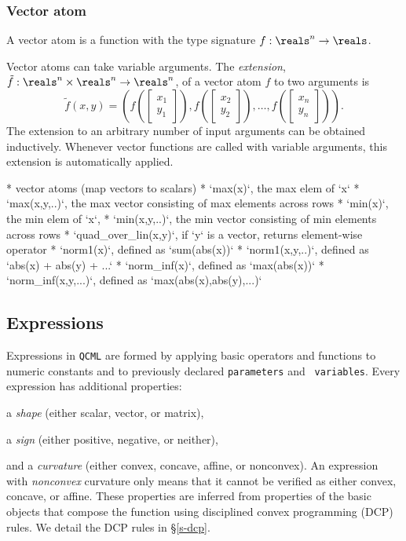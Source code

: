 \documentclass[11pt]{article}
\def\qcml{\texttt{QCML}\xspace}
\begin{document}
\subsubsection{Vector atom}
A vector atom is a function with the type signature $f : \reals^n \to \reals$.


Vector atoms can take variable arguments. 
The \emph{extension}, $\tilde f : \reals^n \times \reals^n \to \reals^n$, of 
a vector atom $f$ to two arguments is
\[
\tilde f(x, y) = \left( f\left(\begin{bmatrix} x_1 \\ y_1 \end{bmatrix}\right), 
  f\left(\begin{bmatrix}x_2 \\ y_2 \end{bmatrix}\right), \ldots, 
  f\left(\begin{bmatrix}x_n \\ y_n\end{bmatrix}\right) \right).
\]
The extension to an arbitrary number of input arguments can be obtained inductively.
Whenever vector functions are called with variable arguments, this extension
is automatically applied.

* vector atoms (map vectors to scalars)
  * `max(x)`, the max elem of `x`
  * `max(x,y,..)`, the max vector consisting of max elements across rows
  * `min(x)`, the min elem of `x`,
  * `min(x,y,..)`, the min vector consisting of min elements across rows
  * `quad\_over\_lin(x,y)`, if `y` is a vector, returns element-wise operator
  * `norm1(x)`, defined as `sum(abs(x))`
  * `norm1(x,y,..)`, defined as `abs(x) + abs(y) + ...`
  * `norm\_inf(x)`, defined as `max(abs(x))`
  * `norm\_inf(x,y,...)`, defined as `max(abs(x),abs(y),...)`
  
\subsection{Expressions}
Expressions in \qcml are formed by applying basic operators and functions to
numeric constants and to previously declared {\tt parameters} and {\tt
variables}. Every expression has additional properties:
\BIT
\item a \emph{shape} (either scalar, vector, or matrix),
\item a \emph{sign} (either positive, negative, or neither),
\item and a \emph{curvature} (either convex, concave, affine, or nonconvex).
\EIT
An expression with \emph{nonconvex} curvature only means that it cannot be verified as either convex, concave, or affine. These properties are inferred from properties of the basic objects that compose the function using disciplined convex programming (DCP) rules. We detail the DCP rules in \S\ref{s-dcp}.
\end{document}
